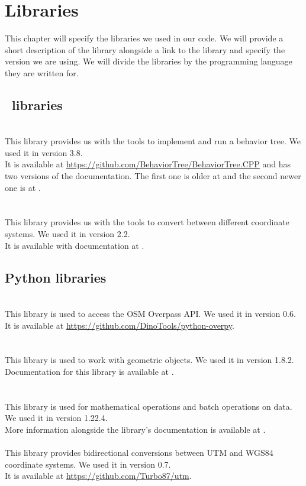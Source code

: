 \chapter{Libraries}
\label{sec:libraries}
    This chapter will specify the libraries we used in our code. We will provide a short description of the library alongside a link to the library and specify the version we are using. We will divide the libraries by the programming language they are written for.

    \section{\CC\ libraries}
        \\
            This library provides us with the tools to implement and run a behavior tree. We used it in version 3.8.\\
            It is available at \url{https://github.com/BehaviorTree/BehaviorTree.CPP} and has two versions of the documentation. The first one is older at \cite{BT_docs} and the second newer one is at \cite{BT_docs_new}.\\\\
        \\
            This library provides us with the tools to convert between different coordinate systems. We used it in version 2.2.\\
            It is available with documentation at \cite{GeographicLib}.

    \section{Python libraries}
        \\
            This library is used to access the OSM Overpass API. We used it in version 0.6.\\
            It is available at \url{https://github.com/DinoTools/python-overpy}.\\\\
        \\
            This library is used to work with geometric objects. We used it in version 1.8.2.\\
            Documentation for this library is available at \cite{shapely}.\\\\
        \\
            This library is used for mathematical operations and batch operations on data. We used it in version 1.22.4.\\
            More information alongside the library's documentation is available at \cite{numpy}.\\
        \\
            This library provides bidirectional conversions between UTM and WGS84 coordinate systems. We used it in version 0.7.\\
            It is available at \url{https://github.com/Turbo87/utm}.
